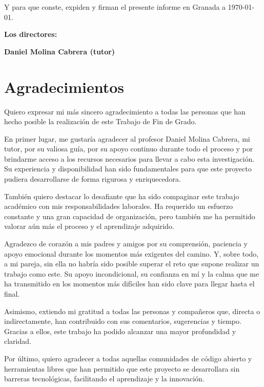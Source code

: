 \vspace{0.5cm}

Y para que conste, expiden y firman el presente informe en Granada a \today.

\vspace{1cm}

\textbf{Los directores:}

\vspace{5cm}

\noindent \textbf{Daniel Molina Cabrera (tutor)}

\chapter*{Agradecimientos}
\thispagestyle{empty}

\vspace{1cm}


Quiero expresar mi más sincero agradecimiento a todas las personas que han hecho posible la realización de este Trabajo de Fin de Grado.

En primer lugar, me gustaría agradecer al profesor Daniel Molina Cabrera, mi tutor, por su valiosa guía, por su apoyo continuo durante
todo el proceso y por brindarme acceso a los recursos necesarios para llevar a cabo esta investigación.
Su experiencia y disponibilidad han sido fundamentales para que este proyecto pudiera desarrollarse de forma rigurosa y enriquecedora.

También quiero destacar lo desafiante que ha sido compaginar este trabajo académico con mis responsabilidades laborales.
Ha requerido un esfuerzo constante y una gran capacidad de organización, pero también me ha permitido valorar aún más el proceso y el aprendizaje adquirido.

Agradezco de corazón a mis padres y amigos por su comprensión, paciencia y apoyo emocional durante los momentos más exigentes del camino.
Y, sobre todo, a mi pareja, sin ella no habría sido posible superar el reto que supone realizar un trabajo como este.
Su apoyo incondicional, su confianza en mí y la calma que me ha transmitido en los momentos más difíciles han sido clave para llegar hasta el final.

Asimismo, extiendo mi gratitud a todas las personas y compañeros que, directa o indirectamente, han contribuido con sus comentarios, sugerencias y tiempo.
Gracias a ellos, este trabajo ha podido alcanzar una mayor profundidad y claridad.

Por último, quiero agradecer a todas aquellas comunidades de código abierto y herramientas libres que han permitido que este proyecto se
desarrollara sin barreras tecnológicas, facilitando el aprendizaje y la innovación.
